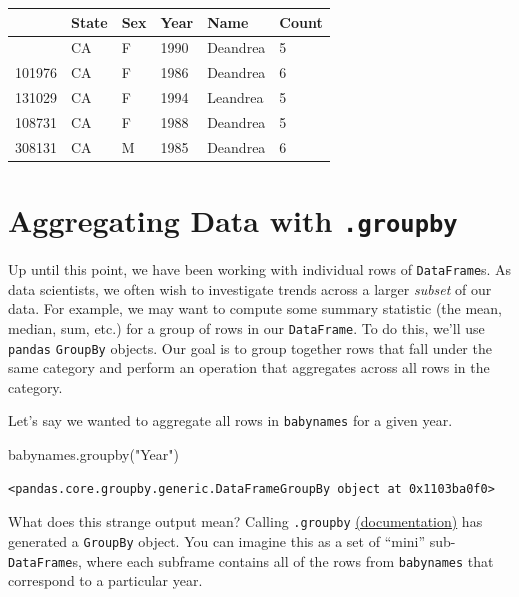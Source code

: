 \documentclass[
  letterpaper,
  DIV=11,
  numbers=noendperiod]{scrreprt}
\newenvironment{Shaded}{\begin{snugshade}}{\end{snugshade}}
\newcommand{\NormalTok}[1]{\textcolor[rgb]{0.00,0.23,0.31}{#1}}
\newcommand{\StringTok}[1]{\textcolor[rgb]{0.13,0.47,0.30}{#1}}
\begin{document}
\begin{longtable}[]{@{}llllll@{}}
\toprule\noalign{}
& State & Sex & Year & Name & Count \\
\midrule\noalign{}
\endhead
\bottomrule\noalign{}
\endlastfoot
115957 & CA & F & 1990 & Deandrea & 5 \\
101976 & CA & F & 1986 & Deandrea & 6 \\
131029 & CA & F & 1994 & Leandrea & 5 \\
108731 & CA & F & 1988 & Deandrea & 5 \\
308131 & CA & M & 1985 & Deandrea & 6 \\
\end{longtable}

\section{\texorpdfstring{Aggregating Data with
\texttt{.groupby}}{Aggregating Data with .groupby}}\label{aggregating-data-with-.groupby}

Up until this point, we have been working with individual rows of
\texttt{DataFrame}s. As data scientists, we often wish to investigate
trends across a larger \emph{subset} of our data. For example, we may
want to compute some summary statistic (the mean, median, sum, etc.) for
a group of rows in our \texttt{DataFrame}. To do this, we'll use
\texttt{pandas} \texttt{GroupBy} objects. Our goal is to group together
rows that fall under the same category and perform an operation that
aggregates across all rows in the category.

Let's say we wanted to aggregate all rows in \texttt{babynames} for a
given year.

\begin{Shaded}
\begin{Highlighting}[]
\NormalTok{babynames.groupby(}\StringTok{"Year"}\NormalTok{)}
\end{Highlighting}
\end{Shaded}

\begin{verbatim}
<pandas.core.groupby.generic.DataFrameGroupBy object at 0x1103ba0f0>
\end{verbatim}

What does this strange output mean? Calling \texttt{.groupby}
\href{https://pandas.pydata.org/pandas-docs/stable/reference/api/pandas.DataFrame.groupby.html}{(documentation)}
has generated a \texttt{GroupBy} object. You can imagine this as a set
of ``mini'' sub-\texttt{DataFrame}s, where each subframe contains all of
the rows from \texttt{babynames} that correspond to a particular year.
\end{document}
